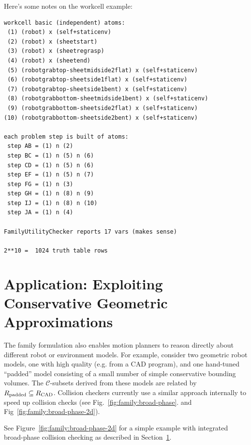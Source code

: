 Here's some notes on the workcell example:

\begin{verbatim}
workcell basic (independent) atoms:
 (1) (robot) x (self+staticenv)
 (2) (robot) x (sheetstart)
 (3) (robot) x (sheetregrasp)
 (4) (robot) x (sheetend)
 (5) (robotgrabtop-sheetmidside2flat) x (self+staticenv)
 (6) (robotgrabtop-sheetside1flat) x (self+staticenv)
 (7) (robotgrabtop-sheetside1bent) x (self+staticenv)
 (8) (robotgrabbottom-sheetmidside1bent) x (self+staticenv)
 (9) (robotgrabbottom-sheetside2flat) x (self+staticenv)
(10) (robotgrabbottom-sheetside2bent) x (self+staticenv)

each problem step is built of atoms:
 step AB = (1) n (2)
 step BC = (1) n (5) n (6)
 step CD = (1) n (5) n (6)
 step EF = (1) n (5) n (7)
 step FG = (1) n (3)
 step GH = (1) n (8) n (9)
 step IJ = (1) n (8) n (10)
 step JA = (1) n (4)

FamilyUtilityChecker reports 17 vars (makes sense)

2**10 =  1024 truth table rows
\end{verbatim}

\section{Application: Exploiting Conservative Geometric Approximations}
\label{subsec:family:broad-phase}

The family formulation also enables motion planners to
reason directly about different robot or environment models.
For example, consider two geometric robot models,
one with high quality (e.g. from a CAD program),
and one hand-tuned ``padded'' model consisting of 
a small number of simple conservative bounding volumes.
The $\mathcal{C}$-subsets derived from these models
are related by $R_{\mbox{\scriptsize padded}} \subseteq R_{\mbox{\scriptsize CAD}}$.
Collision checkers currently use a similar approach internally
to speed up collision checks (see Fig.~\ref{fig:family:broad-phase}.
and Fig~\ref{fig:family:broad-phase-2d}).

See Figure~\ref{fig:family:broad-phase-2d}
for a simple example with integrated broad-phase collision checking
as described in Section~\ref{subsec:family:broad-phase}.

